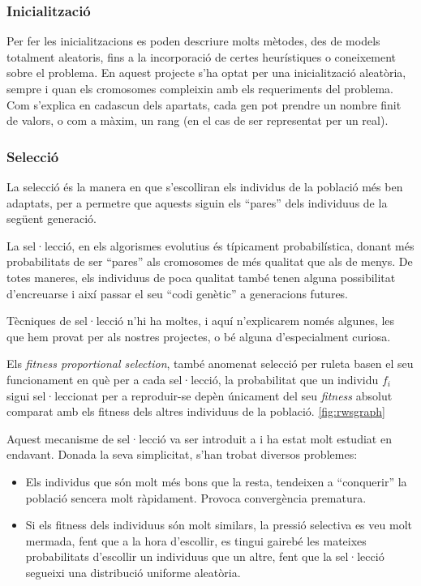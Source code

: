 \subsubsection{Inicialització} 

Per fer les inicialitzacions es poden descriure molts mètodes, des de models
totalment aleatoris, fins a la incorporació de certes heurístiques o coneixement
sobre el problema. En aquest projecte s'ha optat per una inicialització
aleatòria, sempre i quan els cromosomes compleixin amb els requeriments del
problema.  Com s'explica en cadascun dels apartats, cada gen pot prendre un
nombre finit de valors, o com a màxim, un rang (en el cas de ser representat per
un real).

\subsubsection{Selecció}
\label{subs:Iseleccio}
La selecció és la manera en que s'escolliran els individus de la població més
ben adaptats, per a permetre que aquests siguin els ``pares'' dels individuus de
la següent generació.

La sel·lecció, en els algorismes evolutius és típicament probabilística, donant
més probabilitats de ser ``pares'' als cromosomes de més qualitat que als de
menys.  De totes maneres, els individuus de poca qualitat també tenen alguna
possibilitat d'encreuarse i així passar el seu ``codi genètic'' a generacions
futures.

Tècniques de sel·lecció n'hi ha moltes, i aquí n'explicarem només algunes, les
que hem provat per als nostres projectes, o bé alguna d'especialment curiosa.

Els \emph{fitness proportional selection}, també anomenat selecció per ruleta
basen el seu funcionament en què per a cada sel·lecció, la probabilitat que un
individu $f_i$ sigui sel·leccionat per a reproduir-se depèn únicament del seu
\emph{fitness} absolut comparat amb els fitness dels altres individuus de la
població. \ref{fig:rwsgraph} 

Aquest mecanisme de sel·lecció va ser introduit a \cite{H75} i ha estat molt
estudiat en endavant.  Donada la seva simplicitat, s'han trobat diversos
problemes:

\begin{itemize}
	\item Els individus que són molt més bons que la resta, tendeixen a
	``conquerir'' la població sencera molt ràpidament. Provoca convergència
	prematura.
	\item Si els fitness dels individuus són molt similars, la pressió selectiva
	es veu molt mermada, fent que a la hora d'escollir, es tingui gairebé les
	mateixes probabilitats d'escollir un individuus que un altre, fent que la
	sel·lecció segueixi una distribució uniforme aleatòria.
\end{itemize}



